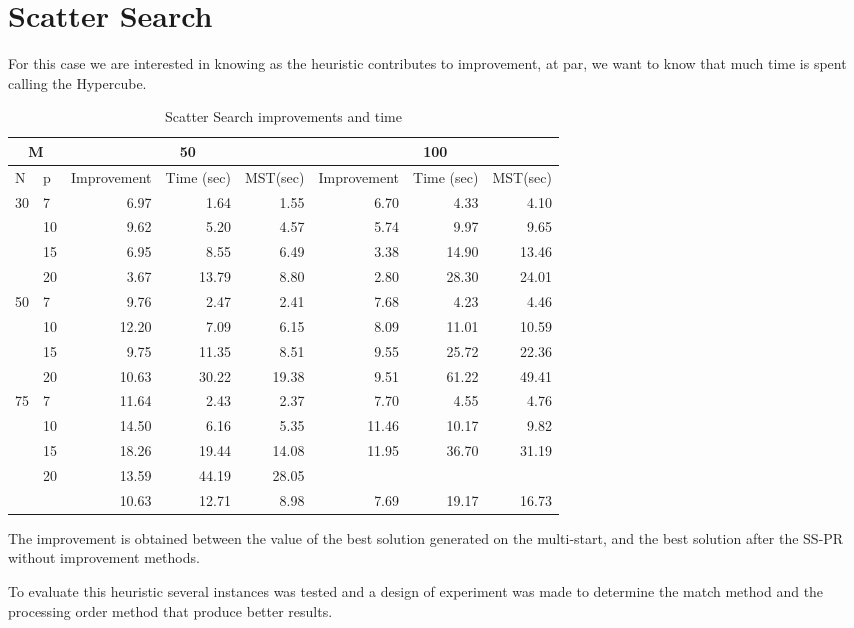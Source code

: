 \section{Scatter Search}
For this case
we are interested in knowing
as the heuristic contributes to improvement,
at par,
we want to know
that much time is spent
calling the Hypercube.

\begin{table}[h]
  \begin{tabular}{|l|l|r|r|r|r|r|r|}
    \hline
    \multicolumn{2}{|c|}{M}
    & \multicolumn{3}{|c|}{50}
    & \multicolumn{3}{|c|}{100} \\ \hline 
    N & p & Improvement & Time (sec) & MST(sec)
    & Improvement & Time (sec) & MST(sec) \\ \hline
    \multirow{4}{*}{30}
    & 7 & 6.97 & 1.64 & 1.55
    & 6.70 & 4.33 & 4.10 \\
    & 10 & 9.62 & 5.20 & 4.57
    & 5.74 & 9.97 & 9.65 \\
    & 15 & 6.95 & 8.55 & 6.49
    & 3.38 & 14.90 & 13.46 \\
    & 20 & 3.67 & 13.79 & 8.80
    & 2.80 & 28.30 & 24.01 \\ \hline
    \multirow{4}{*}{50}
    & 7 & 9.76 & 2.47 & 2.41
    & 7.68 & 4.23 & 4.46 \\
    & 10 & 12.20 & 7.09 & 6.15
    & 8.09 & 11.01 & 10.59 \\
    & 15 & 9.75 & 11.35 & 8.51
    & 9.55 & 25.72 & 22.36 \\
    & 20 & 10.63 & 30.22 & 19.38
    & 9.51 & 61.22 & 49.41 \\ \hline
    \multirow{4}{*}{75}
    & 7 & 11.64 & 2.43 & 2.37
    & 7.70 & 4.55 & 4.76 \\
    & 10 & 14.50 & 6.16 & 5.35
    & 11.46 & 10.17 & 9.82 \\
    & 15 & 18.26 & 19.44 & 14.08
    & 11.95 & 36.70 & 31.19 \\
    & 20 & 13.59 & 44.19 & 28.05
    & & & \\ \hline
    & & 10.63 & 12.71 & 8.98
    & 7.69 & 19.17 & 16.73 \\
    \hline
  \end{tabular}
  \caption[Scatter Search]{Scatter Search improvements and time}
  \label{tab:SS}
\end{table}
The improvement
is obtained
between the value of the best solution
generated on the multi-start,
and the best solution after the SS-PR
without improvement methods.

To evaluate this heuristic
several instances was tested
and
a design of experiment was made
to determine
the match method
and the processing order method
that produce better results.

